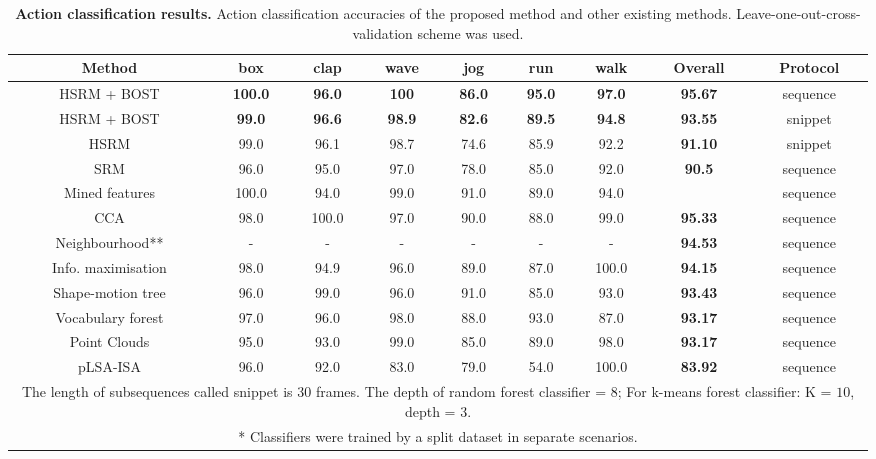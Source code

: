 \begin{sidewaystable}
\centering
\begin{tabular}{|c|c|c|c|c|c|c|c|c|}
\hline
\textbf{Method} & \textbf{box} & \textbf{clap} & \textbf{wave} & \textbf{jog} & \textbf{run} & \textbf{walk} & \textbf{Overall} & \textbf{Protocol} \\
\hline
{HSRM + BOST} & \textbf{ \color{blue} 100.0} & \textbf{ \color{blue}96.0} & \textbf{ \color{blue}100} & \textbf{ \color{blue}86.0} & \textbf{ \color{blue}95.0} & \textbf{ \color{blue}97.0} & \textbf{ \color{blue}95.67} & sequence\\
{HSRM + BOST} & \textbf{ \color{blue} 99.0} & \textbf{ \color{blue} 96.6} & \textbf{ \color{blue}98.9} & \textbf{ \color{blue}82.6} & \textbf{ \color{blue}89.5} & \textbf{ \color{blue}94.8} & \textbf{ \color{blue} 93.55} & snippet\\
HSRM & 99.0 & 96.1 & 98.7 & 74.6 & 85.9 & 92.2 & \textbf{ 91.10} & snippet\\
SRM\cite{Ryoo2009} & 96.0 & 95.0 & 97.0 & 78.0 & 85.0 & 92.0 & \textbf{ 90.5} & sequence\\
\hline
Mined features \cite{Gilbert2009} & 100.0 & 94.0 & 99.0 & 91.0 & 89.0 & 94.0 & \textbf{\color{blue}{96.70}} & sequence\\
CCA \cite{Kim2007} & 98.0 & 100.0 & 97.0 & 90.0 & 88.0 & 99.0 & \textbf{ 95.33} & sequence\\
Neighbourhood** \cite{Kovashka2010} & - & - & - & - & - & - & \textbf{ 94.53} & sequence\\
Info. maximisation \cite{Liu2008} & 98.0 & 94.9 & 96.0 & 89.0 & 87.0 & 100.0 & \textbf{ 94.15} & sequence\\
Shape-motion tree \cite{Lin2009} & 96.0 & 99.0 & 96.0 & 91.0 & 85.0 & 93.0 & \textbf{ 93.43} & sequence\\
Vocabulary forest \cite{Mikolajczyk2008} & 97.0 & 96.0 & 98.0 & 88.0 & 93.0 & 87.0 & \textbf{ 93.17} & sequence\\
Point Clouds \cite{Bregonzio2009} & 95.0 & 93.0 & 99.0 & 85.0 & 89.0 & 98.0 & \textbf{ 93.17} & sequence\\
pLSA-ISA \cite{Wong2007} & 96.0 & 92.0 & 83.0 & 79.0 & 54.0 & 100.0 & \textbf{ 83.92} & sequence\\
\hline
\multicolumn{9}{p{0.9\linewidth}}{
\scriptsize * The length of subsequences called snippet is 30 frames. The depth of random forest classifier = $8$; For k-means forest classifier: K = $10$, depth = $3$. 
}\\
\multicolumn{9}{p{0.9\linewidth}}{
\scriptsize ** Classifiers were trained by a split dataset in separate scenarios. 
}\\
\end{tabular}
\caption{\textbf{Action classification results.} Action classification accuracies of the proposed method and other existing methods. Leave-one-out-cross-validation scheme was used.}
\label{tab/act/compare}
\end{sidewaystable}
